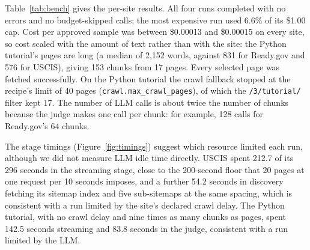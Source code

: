 \documentclass[11pt]{article}
\begin{document}
Table~\ref{tab:bench} gives the per-site results. All four runs completed
with no errors and no budget-skipped calls; the most expensive run used
6.6\% of its \$1.00 cap. Cost per approved sample was between
\$0.00013 and \$0.00015 on every site, so cost scaled with the amount of
text rather than with the site: the Python tutorial's pages are long (a
median of 2{,}152 words, against 831 for Ready.gov and 576 for USCIS),
giving 153 chunks from 17 pages. Every selected page was fetched
successfully. On the Python tutorial the crawl fallback stopped at the
recipe's limit of 40 pages (\texttt{crawl.max\_crawl\_pages}), of which the
\texttt{/3/tutorial/} filter kept 17. The number of LLM calls is about twice
the number of chunks because the judge makes one call per chunk: for
example, 128 calls for Ready.gov's 64 chunks.

The stage timings (Figure~\ref{fig:timings}) suggest which resource
limited each run, although we
did not measure LLM idle time directly. USCIS spent 212.7 of its 296
seconds in the streaming stage, close to the 200-second floor that 20
pages at one request per 10 seconds imposes, and a further 54.2 seconds
in discovery fetching its sitemap index and five sub-sitemaps at the same
spacing, which is consistent with a run limited by the site's declared
crawl delay. The Python tutorial, with no crawl delay and nine times as
many chunks as pages, spent 142.5 seconds streaming and 83.8 seconds in
the judge, consistent with a run limited by the LLM.
\end{document}
